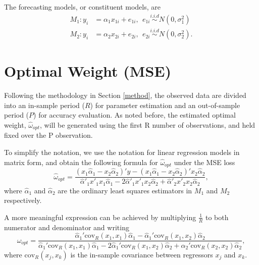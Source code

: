 \documentclass{monashthesis}
\begin{document}
The forecasting models, or constituent models, are
\begin{align*}
M_1: y_i &= \alpha_1 x_{1i} + e_{1i}, \ \ e_{1i} \stackrel{i.i.d}{\sim} N(0,\sigma^2_1) \\
M_2: y_i &= \alpha_2 x_{2i} + e_{2i}, \ \ e_{2i} \stackrel{i.i.d}{\sim} N(0,\sigma^2_2).
\end{align*}

\hypertarget{op}{%
\section{Optimal Weight (MSE)}\label{op}}

Following the methodology in Section \ref{method}, the observed data are divided into an in-sample period (\(R\)) for parameter estimation and an out-of-sample period (\(P\)) for accuracy evaluation. As noted before, the estimated optimal weight, \(\hat\omega_{opt}\), will be generated using the first R number of observations, and held fixed over the P observation.

To simplify the notation, we use the notation for linear regression models in matrix form, and obtain the following formula for \(\hat\omega_{opt}\) under the MSE loss
\begin{equation*}
\hat\omega_{opt} = \frac{(x_1 \hat\alpha_1 - x_2 \hat\alpha_2)' y - (x_1 \hat\alpha_1 - x_2 \hat\alpha_2)' x_2 \hat\alpha_2}{\hat\alpha'_1 x'_1 x_1 \hat\alpha_1 - 2\hat\alpha'_1 x'_1 x_2 \hat\alpha_2 + \hat\alpha'_2 x'_2 x_2 \hat\alpha_2},
\end{equation*}
where \(\hat\alpha_1\) and \(\hat\alpha_2\) are the ordinary least squares estimators in \(M_1\) and \(M_2\) respectively.

A more meaningful expression can be achieved by multiplying \(\frac{1}{R}\) to both numerator and denominator and writing
\begin{equation*}
\label{eqn:opt}
\hat\omega_{opt} = \frac{\hat\alpha_1'\text{cov}_R(x_1,x_1)\hat\alpha_1 - \hat\alpha_1'\text{cov}_R(x_1,x_2)\hat\alpha_2}{\hat\alpha_1' \text{cov}_R(x_1,x_1)\hat\alpha_1 - 2\hat\alpha_1'\text{cov}_R(x_1,x_2)\hat\alpha_2 + \hat\alpha_2'\text{cov}_R(x_2,x_2)\hat\alpha_2},
\end{equation*}
where \(\text{cov}_R(x_j,x_k)\) is the in-sample covariance between regressors \(x_j\) and \(x_k\).
\end{document}
